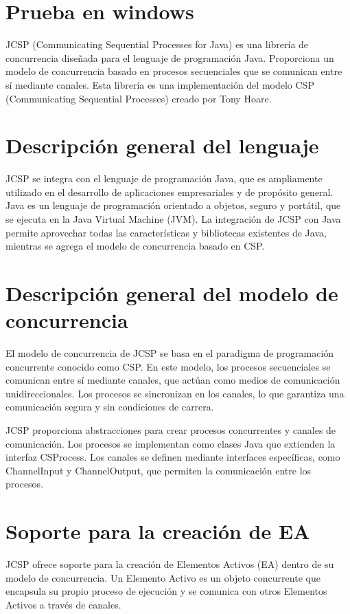 \section*{Prueba en windows}

JCSP (Communicating Sequential Processes for Java) es una librería de concurrencia diseñada para el lenguaje de programación Java. Proporciona un modelo de concurrencia basado en procesos secuenciales que se comunican entre sí mediante canales. Esta librería es una implementación del modelo CSP (Communicating Sequential Processes) creado por Tony Hoare.

\section*{Descripción general del lenguaje}
JCSP se integra con el lenguaje de programación Java, que es ampliamente utilizado en el desarrollo de aplicaciones empresariales y de propósito general. Java es un lenguaje de programación orientado a objetos, seguro y portátil, que se ejecuta en la Java Virtual Machine (JVM). La integración de JCSP con Java permite aprovechar todas las características y bibliotecas existentes de Java, mientras se agrega el modelo de concurrencia basado en CSP.

\section*{Descripción general del modelo de concurrencia}
El modelo de concurrencia de JCSP se basa en el paradigma de programación concurrente conocido como CSP. En este modelo, los procesos secuenciales se comunican entre sí mediante canales, que actúan como medios de comunicación unidireccionales. Los procesos se sincronizan en los canales, lo que garantiza una comunicación segura y sin condiciones de carrera.

JCSP proporciona abstracciones para crear procesos concurrentes y canales de comunicación. Los procesos se implementan como clases Java que extienden la interfaz CSProcess. Los canales se definen mediante interfaces específicas, como ChannelInput y ChannelOutput, que permiten la comunicación entre los procesos.

\section*{Soporte para la creación de EA}
JCSP ofrece soporte para la creación de Elementos Activos (EA) dentro de su modelo de concurrencia. Un Elemento Activo es un objeto concurrente que encapsula su propio proceso de ejecución y se comunica con otros Elementos Activos a través de canales.

